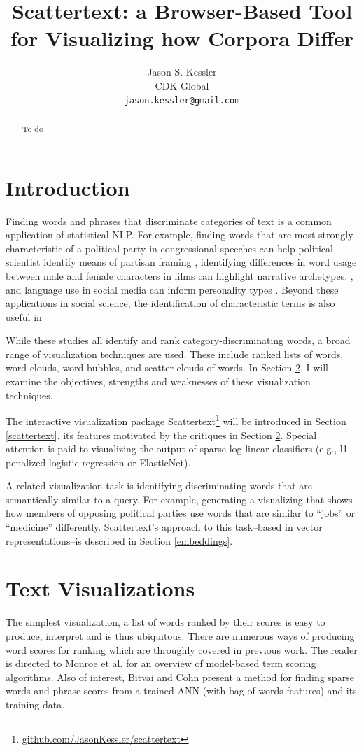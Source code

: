 \documentclass[11pt]{article}
\title{Scattertext: a Browser-Based Tool for Visualizing how Corpora Differ}
\author{Jason S. Kessler \\
  CDK Global \\
  {\tt jason.kessler@gmail.com}  \\}
\date{}
\begin{document}
\maketitle
\begin{abstract}
  To do
\end{abstract}

\section{Introduction}
Finding words and phrases that discriminate categories of text is a common application of statistical NLP. For example, finding words that are most strongly characteristic of a political party in congressional speeches can help political scientist identify means of partisan framing \cite{monroe08,grimmer2010}, identifying differences in word usage between male and female characters in films can highlight narrative archetypes. \cite{schofield2016gender}, and language use in social media can inform personality types \cite{Schwartz13}.  Beyond these applications in social science, the identification of characteristic terms is also useful in 

While these studies all identify and rank category-discriminating words, a broad range of visualization techniques are used.  These include ranked lists of words, word clouds, word bubbles, and scatter clouds of words.  In Section \ref{related}, I will examine the objectives, strengths and weaknesses of these visualization techniques.

The interactive visualization package Scattertext\footnote{\href{http://www.github.com/JasonKessler/scattertext}{github.com/JasonKessler/scattertext}} will be introduced in Section \ref{scattertext}, its features motivated by the critiques in Section \ref{related}.  Special attention is paid to visualizing the output of sparse log-linear classifiers (e.g., l1-penalized logistic regression or ElasticNet).  

A related visualization task is identifying discriminating words that are semantically similar to a query.  For example, generating a visualizing that shows how members of opposing political parties use words that are similar to ``jobs'' or ``medicine'' differently. Scattertext's approach to this task--based in vector representations--is described in Section \ref{embeddings}.  

\section{Text Visualizations}
\label{related}
The simplest visualization, a list of words ranked by their scores is easy to produce, interpret and is thus ubiquitous.  There are numerous ways of producing word scores for ranking which are throughly covered in previous work.  The reader is directed to Monroe et al.  for an overview of model-based term scoring algorithms.  Also of interest, Bitvai and Cohn  present a method for finding sparse words and phrase scores from a trained ANN (with bag-of-words features) and its training data. 
\end{document}
